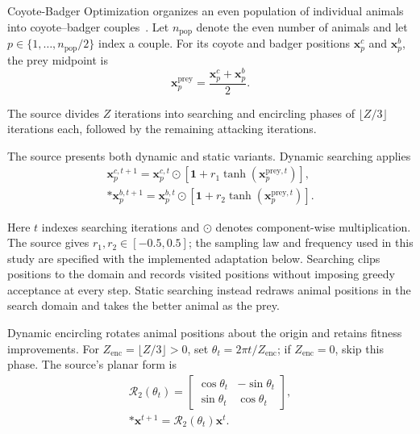 \documentclass[pdflatex,onecolumn,sn-mathphys-num]{sn-jnl}
\begin{document}
Coyote-Badger Optimization organizes an even population of individual animals into coyote--badger couples~\cite{Khatab2025}. Let $n_{\mathrm{pop}}$ denote the even number of animals and let $p\in\{1,\ldots,n_{\mathrm{pop}}/2\}$ index a couple. For its coyote and badger positions $\mathbf{x}_p^c$ and $\mathbf{x}_p^b$, the prey midpoint is
\begin{equation}\label{eq:cbo_prey}
\mathbf{x}_p^{\mathrm{prey}}=\frac{\mathbf{x}_p^c+\mathbf{x}_p^b}{2}.
\end{equation}

The source divides $Z$ iterations into searching and encircling phases of $\lfloor Z/3\rfloor$ iterations each, followed by the remaining attacking iterations.

The source presents both dynamic and static variants. Dynamic searching applies
\begin{gather}
\mathbf{x}_p^{c,t+1}=\mathbf{x}_p^{c,t}\odot\left[\mathbf{1}+r_1\tanh(\mathbf{x}_p^{\mathrm{prey},t})\right],\label{eq:cbo_dynamic_search}\\*
\mathbf{x}_p^{b,t+1}=\mathbf{x}_p^{b,t}\odot\left[\mathbf{1}+r_2\tanh(\mathbf{x}_p^{\mathrm{prey},t})\right].\label{eq:cbo_badger_search}
\end{gather}

Here $t$ indexes searching iterations and $\odot$ denotes component-wise multiplication. The source gives $r_1,r_2\in[-0.5,0.5]$; the sampling law and frequency used in this study are specified with the implemented adaptation below. Searching clips positions to the domain and records visited positions without imposing greedy acceptance at every step. Static searching instead redraws animal positions in the search domain and takes the better animal as the prey.

Dynamic encircling rotates animal positions about the origin and retains fitness improvements. For $Z_{\mathrm{enc}}=\lfloor Z/3\rfloor>0$, set $\theta_t=2\pi t/Z_{\mathrm{enc}}$; if $Z_{\mathrm{enc}}=0$, skip this phase. The source's planar form is
\begin{gather}
\mathcal{R}_2(\theta_t)=
\begin{bmatrix}\cos\theta_t&-\sin\theta_t\\ \sin\theta_t&\cos\theta_t\end{bmatrix},\label{eq:rotation_matrix}\\*
\mathbf{x}^{t+1}=\mathcal{R}_2(\theta_t)\mathbf{x}^{t}.\label{eq:cbo_original_rotation}
\end{gather}
\end{document}
